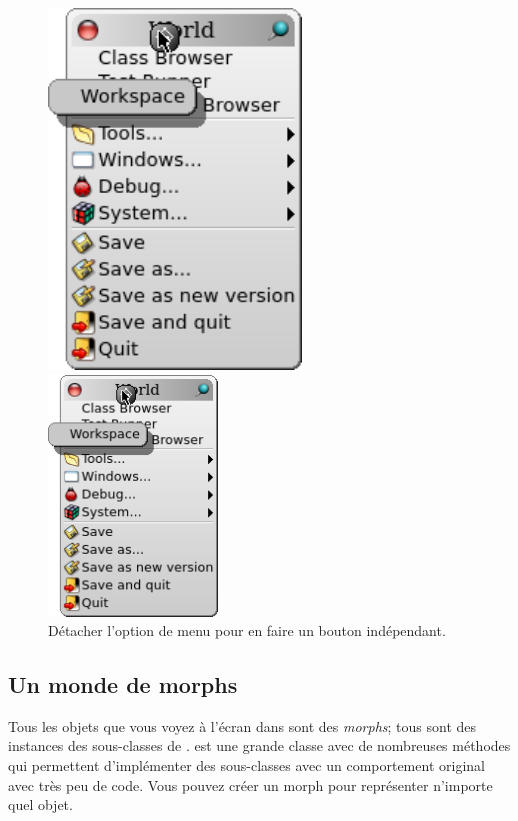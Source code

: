 \documentclass[a4paper,10pt,twoside]{book}
\begin{document}
\begin{figure}[ht]
	\ifluluelse
		{\centerline{\includegraphics[width=0.6\textwidth]{detachingMenu}}}
		{\centerline{\includegraphics[width=0.4\textwidth]{detachingMenu}}}
	\caption{D\'etacher l'option de menu  pour
      en faire un bouton ind\'ependant.\label{fig:detachingMenu}}
\end{figure}

\subsection{Un monde de morphs}
Tous les objets que vous voyez \`a l'\'ecran dans \pharo sont des
\emph{morphs}; tous sont des instances des sous-classes de .
\mbox{} est une grande classe avec de nombreuses m\'ethodes
qui permettent d'impl\'ementer des sous-classes avec un comportement
original avec tr\`es peu de code.
Vous pouvez cr\'eer un morph pour repr\'esenter n'importe quel objet. 
\end{document}
